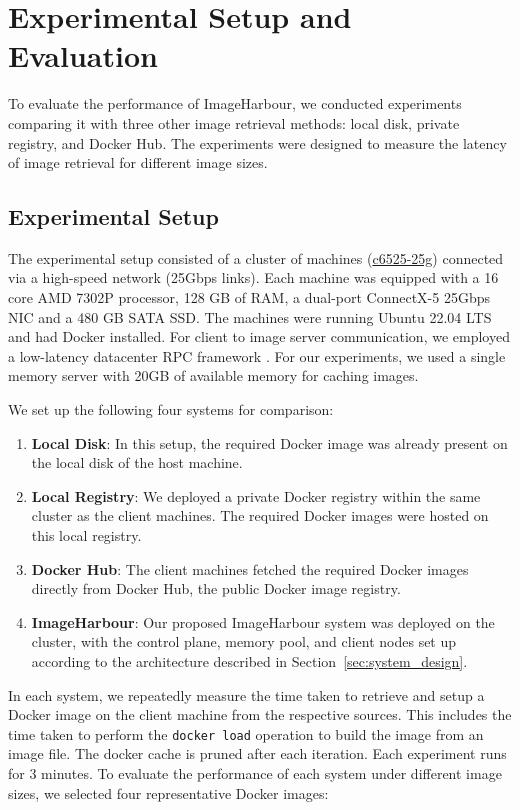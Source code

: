 \section{Experimental Setup and Evaluation}
To evaluate the performance of ImageHarbour, we conducted experiments comparing it with three other image retrieval methods: local disk, private registry, and Docker Hub. The experiments were designed to measure the latency of image retrieval for different image sizes.

\subsection{Experimental Setup}
The experimental setup consisted of a cluster of machines (\href{https://arc.net/l/quote/gpedzjix}{c6525-25g}) connected via a high-speed network (25Gbps links). Each machine was equipped with a 16 core AMD 7302P processor, 128 GB of RAM, a dual-port ConnectX-5 25Gbps NIC and a 480 GB SATA SSD. The machines were running Ubuntu 22.04 LTS and had Docker installed. For client to image server communication, we employed a low-latency datacenter RPC framework \cite{erpc}. For our experiments, we used a single memory server with 20GB of available memory for caching images. 

We set up the following four systems for comparison:
\begin{enumerate}
    \itemsep0em
    \item \textbf{Local Disk}: In this setup, the required Docker image was already present on the local disk of the host machine. 
    \item \textbf{Local Registry}: We deployed a private Docker registry within the same cluster as the client machines. The required Docker images were hosted on this local registry.
    \item \textbf{Docker Hub}: The client machines fetched the required Docker images directly from Docker Hub, the public Docker image registry.
    \item \textbf{ImageHarbour}: Our proposed ImageHarbour system was deployed on the cluster, with the control plane, memory pool, and client nodes set up according to the architecture described in Section~\ref{sec:system_design}.
\end{enumerate}

In each system, we repeatedly measure the time taken to retrieve and setup a Docker image on the client machine from the respective sources. This includes the time taken to perform the \texttt{docker load} operation to build the image from an image file. The docker cache is pruned after each iteration. Each experiment runs for 3 minutes. To evaluate the performance of each system under different image sizes, we selected four representative Docker images:

